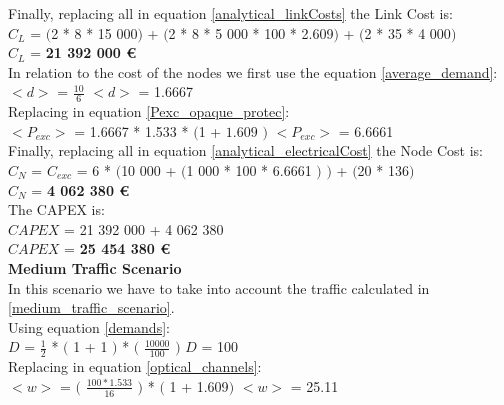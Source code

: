 Finally, replacing all in equation \ref{analytical_linkCosts} the Link Cost is:\\

$C_L$ = $($2 * 8 * 15 000$)$ + $($2 * 8 * 5 000 * 100 * 2.609$)$ + $($2 * 35 * 4 000$)$\\

$C_L$ = \textbf{21 392 000 \euro}\\

In relation to the cost of the nodes we first use the equation \ref{average_demand}:\\

$<d>$ = $\frac{10}{6}$ \qquad \qquad $<d>$ = 1.6667\\

Replacing in equation \ref{Pexc_opaque_protec}:\\

$<P_{exc}>$ = 1.6667 * 1.533 * $($1 + $1.609$ $)$ \qquad \qquad $<P_{exc}>$ = 6.6661 \\

Finally, replacing all in equation \ref{analytical_electricalCost} the Node Cost is:\\

$C_N$ = $C_{exc}$ = 6 * $($10 000 + $($1 000 * 100 * 6.6661 $)$ $)$ + $($20 * 136$)$\\

$C_N$ = \textbf{4 062 380 \euro}\\

The CAPEX is:\\
$CAPEX$ = 21 392 000 + 4 062 380\\

$CAPEX$ = \textbf{25 454 380 \euro}\\

\textbf{Medium Traffic Scenario}\\
In this scenario we have to take into account the traffic calculated in \ref{medium_traffic_scenario}.\\

Using equation \ref{demands}:\\

$D$ = $\frac{1}{2}$ * $($ 1 + 1 $)$ * $($ $\frac{10000}{100}$ $)$ \qquad \qquad $D$ = 100\\

Replacing in equation \ref{optical_channels}:\\

$<w>$ = $($ $\frac{100 * 1.533}{16}$ $)$ * $($ 1 + 1.609$)$ \qquad \qquad $<w>$ = 25.11\\


